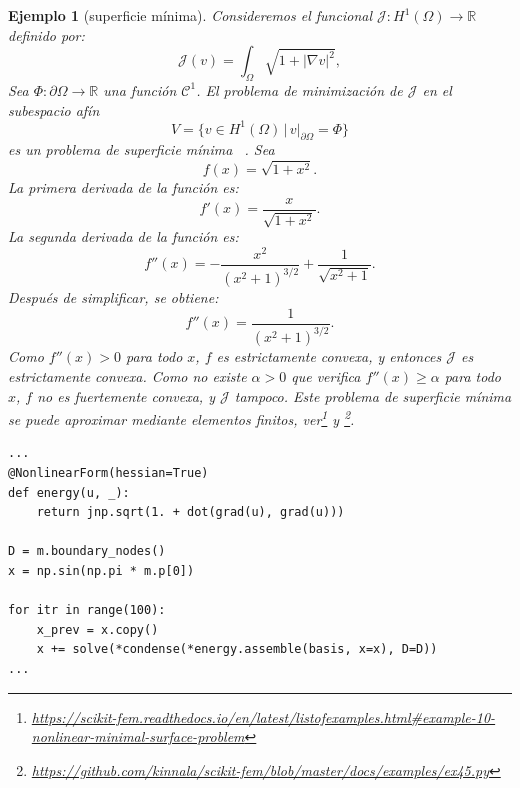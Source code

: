 \documentclass[12pt]{book}
\newtheorem{ex}{Ejemplo}
\theoremstyle{definition}
\theoremstyle{plain}
\theoremstyle{remark}
\begin{document}
\begin{ex}[superficie mínima]
Consideremos el funcional \(\mathcal{J}: H^1(\Omega) \to \mathbb{R}\) definido por:
   \[
   \mathcal{J}(v) = \int_\Omega \sqrt{1 + |\nabla v|^2},\]
Sea $\Phi : \partial \Omega \rightarrow \mathbb{R}$ una función $\mathscr{C}^1$.
El problema de minimización de $\mathcal{J}$ en el subespacio afín 
\[
V = \{ v \in H^1(\Omega) \,|\, v|_{\partial \Omega}=\Phi \}
\]
es un problema de superficie mínima ~\cite{ciarlet2002,johnson1975}. 
Sea 
$$ f(x) = \sqrt{1+x^2}. $$
La primera derivada de la función es:
$$ f'(x) = \frac{x}{\sqrt{1+x^2}}.$$
La segunda derivada de la función es:
$$ f''(x) = -\frac{x^2}{(x^2+1)^{3/2}} + \frac{1}{\sqrt{x^2+1}}. $$
Después de simplificar, se obtiene:
$$ f''(x) = \frac{1}{(x^2+1)^{3/2}}. $$
Como $f''(x)>0$ para todo $x$, $f$ es estrictamente convexa, y entonces $\mathcal{J}$ es estrictamente convexa. Como no existe $\alpha > 0$ que verifica $f''(x)\geq \alpha$ para todo $x$, $f$ no es fuertemente convexa, y $\mathcal{J}$ tampoco.
Este problema de superficie mínima se puede aproximar mediante elementos finitos, ver\footnote{\url{https://scikit-fem.readthedocs.io/en/latest/listofexamples.html\#example-10-nonlinear-minimal-surface-problem}} y \footnote{\url{https://github.com/kinnala/scikit-fem/blob/master/docs/examples/ex45.py}}.
\begin{lstlisting}[style=pythonstyle, caption={Superficie m\'inima.}, label={lst:g1}]
...
@NonlinearForm(hessian=True)
def energy(u, _):
    return jnp.sqrt(1. + dot(grad(u), grad(u)))

D = m.boundary_nodes()
x = np.sin(np.pi * m.p[0])

for itr in range(100):
    x_prev = x.copy()
    x += solve(*condense(*energy.assemble(basis, x=x), D=D))
...
\end{lstlisting}


\end{ex}
\end{document}
